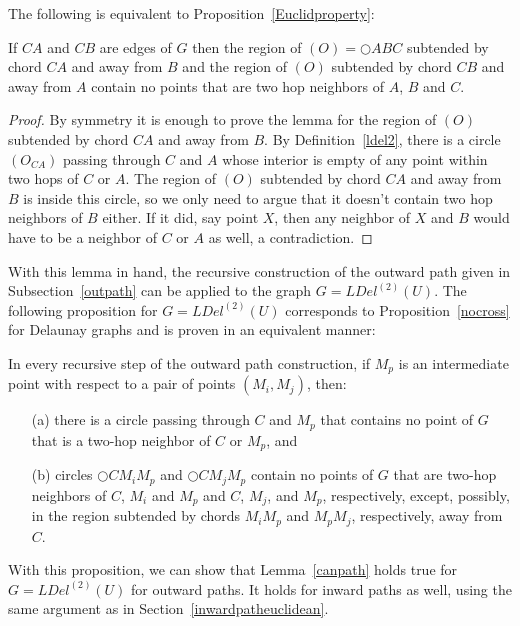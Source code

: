 \documentclass{stacs_proc}
\theoremstyle{plain}\newtheorem{satz}[thm]{Satz}
\begin{document}
The following is equivalent to Proposition~\ref{Euclidproperty}:
\begin{lemma}
\label{UnitDiskproperty} If $CA$ and $CB$ are edges of $G$ then the region
of $(O) = \bigcirc{ABC}$ subtended by chord $CA$ and away from $B$ and
the region of $(O)$ subtended by chord $CB$ and away from $A$ contain no
points that are two hop neighbors of $A$, $B$ and $C$.
\begin{proof}
By symmetry it is enough to prove the lemma for  the region of $(O)$
subtended by chord $CA$ and away from $B$. By Definition~\ref{ldel2},
there is a circle $(O_{CA})$ passing through $C$ and $A$ whose interior
is empty of any point within two hops of $C$ or $A$. The region of $(O)$
subtended by chord $CA$ and away from $B$ is inside this circle, so we only
need to argue that it doesn't contain two hop neighbors of $B$ either. If it
did, say point $X$, then any neighbor of $X$ and $B$ would have to be a
neighbor of $C$ or $A$ as well, a contradiction.
\end{proof}
\end{lemma}
With this lemma in hand, the recursive construction of the outward path given
in Subsection~\ref{outpath} can be applied to the graph $G = LDel^{(2)}(U)$.
The following proposition for $G = LDel^{(2)}(U)$ corresponds to
Proposition~\ref{nocross} for Delaunay graphs and is proven in an equivalent
manner:
\begin{proposition}
\label{nocross2} In every recursive step of the outward path
construction, if $M_p$ is an intermediate point with
respect to a pair of points $(M_i,M_j)$, then:
\begin{itemize}

\item[(a)] there is a circle passing through $C$ and $M_p$ that contains
no point of $G$ that is a two-hop neighbor of $C$ or $M_p$, and

\item[(b)] circles $\bigcirc{CM_iM_p}$ and $\bigcirc{CM_jM_p}$ contain no
points of $G$ that are two-hop neighbors of $C$, $M_i$ and $M_p$ and $C$,
$M_j$, and $M_p$, respectively, except, possibly, in the region subtended by
chords $M_iM_p$ and $M_pM_j$, respectively, away from $C$.
\end{itemize}
\end{proposition}
With this proposition, we can show that Lemma~\ref{canpath} holds
true for $G = LDel^{(2)}(U)$ for outward paths. It holds for inward paths
as well, using the same argument as in Section~\ref{inwardpatheuclidean}.  
\end{document}

